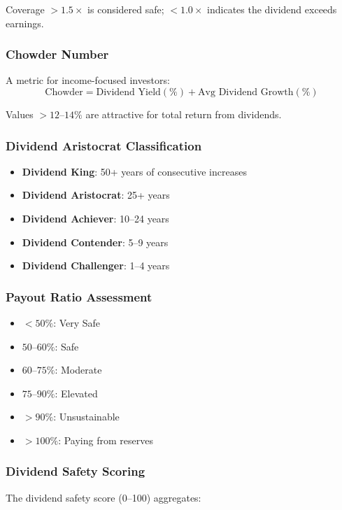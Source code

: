 Coverage $> 1.5\times$ is considered safe; $< 1.0\times$ indicates the dividend exceeds earnings.

\subsubsection{Chowder Number}

A metric for income-focused investors:
\[
\text{Chowder} = \text{Dividend Yield}(\%) + \text{Avg Dividend Growth}(\%)
\]

Values $> 12$--$14\%$ are attractive for total return from dividends.

\subsubsection{Dividend Aristocrat Classification}

\begin{itemize}
  \item[] \textbf{Dividend King}: 50+ years of consecutive increases
  \item[] \textbf{Dividend Aristocrat}: 25+ years
  \item[] \textbf{Dividend Achiever}: 10--24 years
  \item[] \textbf{Dividend Contender}: 5--9 years
  \item[] \textbf{Dividend Challenger}: 1--4 years
\end{itemize}

\subsubsection{Payout Ratio Assessment}

\begin{itemize}
  \item[] $< 50\%$: Very Safe
  \item[] $50$--$60\%$: Safe
  \item[] $60$--$75\%$: Moderate
  \item[] $75$--$90\%$: Elevated
  \item[] $> 90\%$: Unsustainable
  \item[] $> 100\%$: Paying from reserves
\end{itemize}

\subsubsection{Dividend Safety Scoring}

The dividend safety score (0--100) aggregates:

